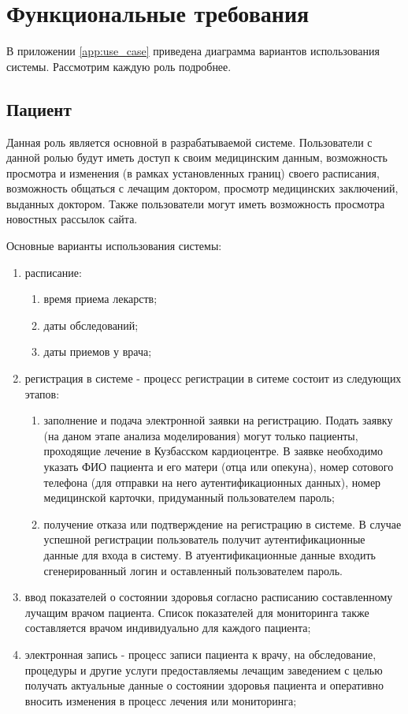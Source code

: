 \newpage
\section{Функциональные требования}

В приложении \ref{app:use_case} приведена диаграмма вариантов использования
системы. Рассмотрим каждую роль подробнее.

\subsection{Пациент}
Данная роль является основной в разрабатываемой системе. Пользователи с данной
ролью будут иметь доступ к своим медицинским данным, возможность просмотра и
изменения (в рамках установленных границ) своего расписания, возможность
общаться с лечащим доктором, просмотр медицинских заключений, выданных доктором.
Также пользователи могут иметь возможность просмотра новостных рассылок сайта.

Основные варианты использования системы:

\begin{enumerate}
  \item расписание:
  \begin{enumerate}
    \item время приема лекарств;
    \item даты обследований;
    \item даты приемов у врача;     
  \end{enumerate}
  \item регистрация в системе - процесс регистрации в ситеме состоит из
  следующих этапов:
  \begin{enumerate}
    \item заполнение и подача электронной заявки на регистрацию. Подать заявку
    (на даном этапе анализа моделирования) могут только пациенты, проходящие
    лечение в Кузбасском кардиоцентре. 
    В заявке необходимо указать ФИО пациента и его матери (отца или опекуна), номер сотового телефона (для отправки на него аутентификационных данных), номер медицинской карточки, придуманный пользователем пароль;
    \item получение отказа или подтверждение на регистрацию в системе. В случае
    успешной регистрации пользователь получит аутентификационные данные для
    входа в систему. В атуентификационные данные входить сгенерированный логин и
    оставленный пользователем пароль.
  \end{enumerate}
  \item ввод показателей о состоянии здоровья согласно расписанию составленному
лучащим врачом пациента. Список показателей для мониторинга также составляется
врачом индивидуально для каждого пациента;
  \item электронная запись - процесс записи пациента к врачу, на обследование,
процедуры и другие услуги предоставляемы лечащим заведением с целью получать
актуальные данные о состоянии здоровья пациента и оперативно вносить изменения в процесс лечения или мониторинга;
\end{enumerate}

